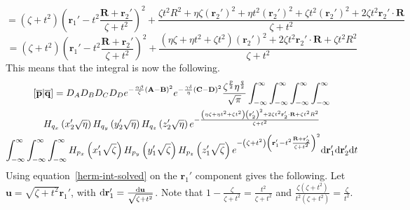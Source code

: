 \begin{equation}
  = \left(\zeta + t^2\right)\left(\mathbf{r}_1' - t^2\frac{\mathbf{R} + \mathbf{r}_2'}{\zeta + t^2}\right)^2 + \frac{\zeta t^2 R^2 + \eta\zeta \left(\mathbf{r}_2'\right)^2 + \eta t^2 \left(\mathbf{r}_2'\right)^2 + \zeta t^2 \left(\mathbf{r}_2'\right)^2 + 2\zeta t^2 \mathbf{r}_2'\cdot\mathbf{R}}{\zeta + t^2}
\end{equation}
\begin{equation}
  = \left(\zeta + t^2\right)\left(\mathbf{r}_1' - t^2\frac{\mathbf{R} + \mathbf{r}_2'}{\zeta + t^2}\right)^2 + \frac{\left(\eta\zeta + \eta t^2 + \zeta t^2\right)\left(\mathbf{r}_2'\right)^2 + 2\zeta t^2 \mathbf{r}_2'\cdot\mathbf{R} + \zeta t^2 R^2}{\zeta + t^2}
\end{equation}
This means that the integral is now the following.
\begin{multline}
  \left[\overline{\mathbf{p}}\middle|\overline{\mathbf{q}}\right] = D_A D_B D_C D_D e^{-\frac{\alpha\beta}{\zeta}\left(\mathbf{A} - \mathbf{B}\right)^2}e^{-\frac{\gamma\delta}{\eta}\left(\mathbf{C} - \mathbf{D}\right)^2}\frac{\zeta^{\frac{p}{2}}\eta^{\frac{q}{2}}}{\sqrt{\pi}} \int_{-\infty}^\infty\int_{-\infty}^\infty\int_{-\infty}^\infty\int_{-\infty}^\infty\\
  H_{q_x}\left(x_2'\sqrt{\eta}\right)H_{q_y}\left(y_2'\sqrt{\eta}\right)H_{q_z}\left(z_2'\sqrt{\eta}\right) e^{-\frac{\left(\eta\zeta + \eta t^2 + \zeta t^2\right)\left(\mathbf{r}_2'\right)^2 + 2\zeta t^2 \mathbf{r}_2'\cdot\mathbf{R} + \zeta t^2 R^2}{\zeta + t^2}} \\
  \int_{-\infty}^\infty\int_{-\infty}^\infty\int_{-\infty}^\infty H_{p_x}\left(x_1'\sqrt{\zeta}\right)H_{p_y}\left(y_1'\sqrt{\zeta}\right)H_{p_z}\left(z_1'\sqrt{\zeta}\right) e^{- \left(\zeta + t^2\right)\left(\mathbf{r}_1' - t^2\frac{\mathbf{R} + \mathbf{r}_2'}{\zeta + t^2}\right)^2} \mathrm{d}\mathbf{r}_1' \mathrm{d}\mathbf{r}_2' \mathrm{d} t
\end{multline}
Using equation~\ref{herm-int-solved} on the $\mathbf{r}_1'$ component gives the following. Let $\mathbf{u} = \sqrt{\zeta + t^2}\mathbf{r}_1'$, with $\mathrm{d}\mathbf{r}_1' = \frac{\mathrm{d}\mathbf{u}}{\sqrt{\zeta + t^2}}$. Note that $1 - \frac{\zeta}{\zeta + t^2} = \frac{t^2}{\zeta + t^2}$ and $\frac{\zeta \left(\zeta + t^2\right)}{t^2 \left(\zeta + t^2\right)} = \frac{\zeta}{t^2}$.
